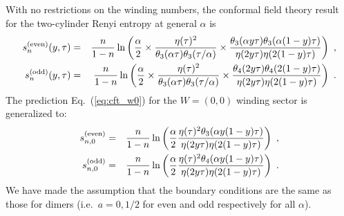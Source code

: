\documentclass[11pt]{iopart}
\begin{document}
With no restrictions on the winding numbers, the conformal field theory result for the two-cylinder Renyi entropy at general $\alpha$ is
\begin{eqnarray}\label{eq:cft_prediction_gen}
 s_n^{\rm (even)}(y,\tau)&=&\frac{n}{1-n}\ln \left(\frac{\alpha}{2}\times\frac{\eta(\tau)^2}{\theta_3(\alpha\tau)\theta_3(\tau/\alpha)}\times\frac{\theta_3(\alpha y \tau)\theta_3(\alpha(1-y)\tau)}{\eta(2y\tau)\eta(2(1-y)\tau)}\right)\ ,\\ 
 \label{eq:cft_prediction_gen_odd}
 s_n^{\rm (odd)}(y,\tau)&=&\frac{n}{1-n}\ln \left(\frac{\alpha}{2}\times\frac{\eta(\tau)^2}{\theta_3(\alpha\tau)\theta_3(\tau/\alpha)}\times\frac{\theta_4(2y \tau)\theta_4(2(1-y)\tau)}{\eta(2y\tau)\eta(2(1-y)\tau)}\right)\ .
\end{eqnarray}
The prediction Eq.~(\ref{eq:cft_w0}) for the $W=(0,0)$ winding sector is generalized to:
\begin{eqnarray}\label{eq:cft_w0_gen}
 s_{n,0}^{\rm (even)}&=&\frac{n}{1-n}\ln \left(\frac{\alpha}{2}\frac{\eta(\tau)^2\theta_3(\alpha y(1-y)\tau)}{\eta(2y\tau)\eta(2(1-y)\tau)}\right)\ , \\
 \label{eq:cft_w0_gen2}
 s_{n,0}^{\rm (odd )}&=&\frac{n}{1-n}\ln \left(\frac{\alpha}{2}\frac{\eta(\tau)^2\theta_4(\alpha y(1-y)\tau)}{\eta(2y\tau)\eta(2(1-y)\tau)}\right)\ .
\end{eqnarray}
We have made the assumption that the boundary conditions are the same as those for dimers (i.e.\ $a=0,1/2$ for even and odd respectively for all $\alpha$).
\end{document}
